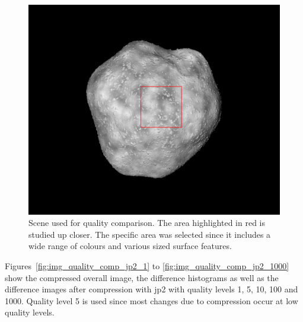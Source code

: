 \begin{figure}[htb]
    \centering
    \includegraphics[width=.7\textwidth]{doc/thesis/0_figures/compare_quality/set1/jp2_1000_frame.png}
    \caption{Scene used for quality comparison. The area highlighted in red is studied up closer. The specific area was selected since it includes a wide range of colours and various sized surface features.}
    \label{fig:img_quality_frame}
\end{figure}

Figures~\ref{fig:img_quality_comp_jp2_1} to \ref{fig:img_quality_comp_jp2_1000} show the compressed overall image, the difference histograms as well as the difference images after compression with \gls{jp2} with quality levels \SI{1}{}, \SI{5}{}, \SI{10}{}, \SI{100}{} and \SI{1000}{}. Quality level \SI{5}{} is used since most changes due to compression occur at low quality levels.

